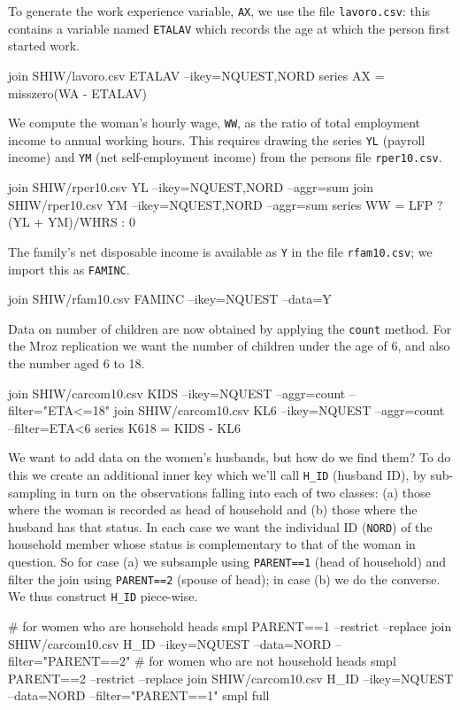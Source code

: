 To generate the work experience variable, \texttt{AX}, we use the file
\texttt{lavoro.csv}: this contains a variable named \texttt{ETALAV}
which records the age at which the person first started work.
%
\begin{code}
join SHIW/lavoro.csv ETALAV --ikey=NQUEST,NORD
series AX = misszero(WA - ETALAV)
\end{code}
%
We compute the woman's hourly wage, \texttt{WW}, as the ratio of total
employment income to annual working hours.  This requires drawing the
series \texttt{YL} (payroll income) and \texttt{YM} (net
self-employment income) from the persons file \texttt{rper10.csv}.
%
\begin{code}
join SHIW/rper10.csv YL --ikey=NQUEST,NORD --aggr=sum
join SHIW/rper10.csv YM --ikey=NQUEST,NORD --aggr=sum
series WW = LFP ? (YL + YM)/WHRS : 0
\end{code}
%
The family's net disposable income is available as \texttt{Y} in the file
\texttt{rfam10.csv}; we import this as \texttt{FAMINC}.
%
\begin{code}
join SHIW/rfam10.csv FAMINC --ikey=NQUEST --data=Y
\end{code}
%
Data on number of children are now obtained by applying the
\texttt{count} method. For the Mroz replication we want the number of
children under the age of 6, and also the number aged 6 to 18.
%
\begin{code}
join SHIW/carcom10.csv KIDS --ikey=NQUEST --aggr=count --filter="ETA<=18"
join SHIW/carcom10.csv KL6 --ikey=NQUEST --aggr=count --filter=ETA<6
series K618 = KIDS - KL6
\end{code}
%
We want to add data on the women's husbands, but how do we find them?
To do this we create an additional inner key which we'll call
\verb|H_ID| (husband ID), by sub-sampling in turn on the observations
falling into each of two classes: (a) those where the woman is
recorded as head of household and (b) those where the husband has that
status. In each case we want the individual ID (\texttt{NORD}) of the
household member whose status is complementary to that of the woman in
question. So for case (a) we subsample using \texttt{PARENT==1} (head
of household) and filter the join using \texttt{PARENT==2} (spouse of
head); in case (b) we do the converse. We thus construct \verb|H_ID|
piece-wise.
%
\begin{code}
# for women who are household heads
smpl PARENT==1 --restrict --replace
join SHIW/carcom10.csv H_ID --ikey=NQUEST --data=NORD --filter="PARENT==2"
# for women who are not household heads
smpl PARENT==2 --restrict --replace
join SHIW/carcom10.csv H_ID --ikey=NQUEST --data=NORD --filter="PARENT==1"
smpl full
\end{code}
